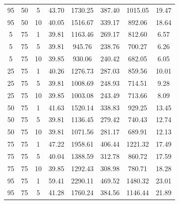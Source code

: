 \begin{table}[H]
\begin{tabular}{ccc|c|c|c|c|c}
95 & 50 & 5 & \cellcolor{gray!41}43.70 & \cellcolor{gray!1}1730.25 & \cellcolor{gray!1}387.40 & \cellcolor{gray!1}1015.05 & 19.47\\
95 & 50 & 10 & \cellcolor{gray!78}40.05 & \cellcolor{gray!1}1516.67 & \cellcolor{gray!1}339.17 & \cellcolor{gray!9}892.06 & 18.64\\
5 & 75 & 1 & \cellcolor{gray!80}39.81 & \cellcolor{gray!7}1163.46 & \cellcolor{gray!1}269.17 & \cellcolor{gray!34}812.60 & 6.57\\
5 & 75 & 5 & \cellcolor{gray!80}39.81 & \cellcolor{gray!44}945.76 & \cellcolor{gray!22}238.76 & \cellcolor{gray!68}700.27 & 6.26\\
5 & 75 & 10 & \cellcolor{gray!80}39.85 & \cellcolor{gray!46}930.06 & \cellcolor{gray!21}240.42 & \cellcolor{gray!74}682.05 & 6.05\\
25 & 75 & 1 & \cellcolor{gray!76}40.26 & \cellcolor{gray!1}1276.73 & \cellcolor{gray!1}287.03 & \cellcolor{gray!19}859.56 & 10.01\\
25 & 75 & 5 & \cellcolor{gray!80}39.81 & \cellcolor{gray!33}1008.69 & \cellcolor{gray!13}248.93 & \cellcolor{gray!64}714.51 & 9.28\\
25 & 75 & 10 & \cellcolor{gray!80}39.85 & \cellcolor{gray!34}1003.08 & \cellcolor{gray!18}243.49 & \cellcolor{gray!64}713.66 & 8.09\\
50 & 75 & 1 & \cellcolor{gray!62}41.63 & \cellcolor{gray!1}1520.14 & \cellcolor{gray!1}338.83 & \cellcolor{gray!1}929.25 & 13.45\\
50 & 75 & 5 & \cellcolor{gray!80}39.81 & \cellcolor{gray!12}1136.45 & \cellcolor{gray!1}279.42 & \cellcolor{gray!56}740.43 & 12.74\\
50 & 75 & 10 & \cellcolor{gray!80}39.81 & \cellcolor{gray!23}1071.56 & \cellcolor{gray!1}281.17 & \cellcolor{gray!71}689.91 & 12.13\\
75 & 75 & 1 & \cellcolor{gray!5}47.22 & \cellcolor{gray!1}1958.61 & \cellcolor{gray!1}406.44 & \cellcolor{gray!1}1221.32 & 17.49\\
75 & 75 & 5 & \cellcolor{gray!78}40.04 & \cellcolor{gray!1}1388.59 & \cellcolor{gray!1}312.78 & \cellcolor{gray!19}860.72 & 17.59\\
75 & 75 & 10 & \cellcolor{gray!80}39.85 & \cellcolor{gray!1}1292.43 & \cellcolor{gray!1}308.98 & \cellcolor{gray!43}780.71 & 18.28\\
95 & 75 & 1 & \cellcolor{gray!1}59.41 & \cellcolor{gray!1}2290.11 & \cellcolor{gray!1}469.52 & \cellcolor{gray!1}1480.32 & 23.01\\
95 & 75 & 5 & \cellcolor{gray!66}41.28 & \cellcolor{gray!1}1760.24 & \cellcolor{gray!1}384.56 & \cellcolor{gray!1}1146.44 & 21.89\\

\end{tabular}
\end{table}
